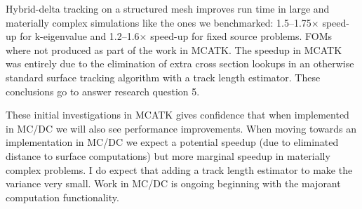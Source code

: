 Hybrid-delta tracking on a structured mesh improves run time in large and materially complex simulations like the ones we benchmarked: 1.5--1.75$\times$ speed-up for k-eigenvalue and 1.2--1.6$\times$ speed-up for fixed source problems.
FOMs where not produced as part of the work in MCATK.
The speedup in MCATK was entirely due to the elimination of extra cross section lookups in an otherwise standard surface tracking algorithm with a track length estimator.
These conclusions go to answer research question 5.

These initial investigations in MCATK gives confidence that when implemented in MC/DC we will also see performance improvements.
When moving towards an implementation in MC/DC we expect a potential speedup (due to eliminated distance to surface computations) but more marginal speedup in materially complex problems.
I do expect that adding  a track length estimator to make the variance very small.
Work in MC/DC is ongoing beginning with the majorant computation functionality.
